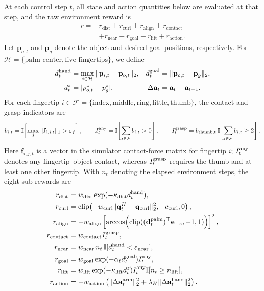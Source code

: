 \documentclass[11pt]{article}
\begin{document}
At each control step $t$, all state and action quantities below are evaluated
at that step, and the raw environment reward is
\begin{align*}
r={}&r_{\text{dist}}+r_{\text{curl}}+r_{\text{align}}+r_{\text{contact}}\\
   &+r_{\text{near}}+r_{\text{goal}}+r_{\text{lift}}+r_{\text{action}}.
\end{align*}
Let $\mathbf p_{o,t}$ and $\mathbf p_g$ denote the object and desired goal
positions, respectively.  For
$\mathcal H=\{\text{palm center},\text{five fingertips}\}$, we define
\begin{align*}
d_t^{\rm hand}
  &=\max_{i\in\mathcal H}\|\mathbf p_{i,t}-\mathbf p_{o,t}\|_2, &
d_t^{\rm goal}
  &=\|\mathbf p_{o,t}-\mathbf p_g\|_2,\\
d_t^{z}
  &=|p_{o,t}^{z}-p_g^{z}|, &
\Delta\mathbf a_t&=\mathbf a_t-\mathbf a_{t-1}.
\end{align*}
For each fingertip
$i\in\mathcal F=\{\mathrm{index,middle,ring,little,thumb}\}$, the contact
and grasp indicators are
\begin{equation*}
b_{i,t}=\mathbb I\!\left[
  \max_j\|\mathbf f_{i,j,t}\|_1>\varepsilon_f
\right],\qquad
I_t^{\rm any}=\mathbb I\!\left[\sum_{i\in\mathcal F}b_{i,t}>0\right],
\qquad
I_t^{\rm grasp}=b_{\rm thumb,t}\,
\mathbb I\!\left[\sum_{i\in\mathcal F}b_{i,t}\geq2\right].
\end{equation*}
Here $\mathbf f_{i,j,t}$ is a vector in the simulator contact-force matrix for
fingertip $i$; $I_t^{\rm any}$ denotes any fingertip--object contact, whereas
$I_t^{\rm grasp}$ requires the thumb and at least one other fingertip.  With
$n_t$ denoting the elapsed environment steps, the eight sub-rewards are
\begin{align*}
r_{\text{dist}}
  &=w_{\rm dist}\exp(-\kappa_{\rm dist}d_t^{\rm hand}),\\
r_{\text{curl}}
  &=\operatorname{clip}\!\left(
      -w_{\rm curl}\|\mathbf q_t^{H}-\mathbf q_{\rm curl}\|_2^2,
      -c_{\rm curl},0
    \right),\\
r_{\text{align}}
  &=-w_{\rm align}\left[
      \arccos\!\left(
        \operatorname{clip}((\mathbf d_t^{\rm palm})^{\top}\mathbf e_{-z},-1,1)
      \right)
    \right]^2,\\
r_{\text{contact}}
  &=w_{\rm contact} I_t^{\rm grasp},\\
r_{\text{near}}
  &=w_{\rm near}\,n_t\,\mathbb I[d_t^{\rm hand}<\varepsilon_{\rm near}],\\
r_{\text{goal}}
  &=w_{\rm goal}\exp(-\alpha_t d_t^{\rm goal})I_t^{\rm any},\\
r_{\text{lift}}
  &=w_{\rm lift}\exp(-\kappa_{\rm lift}d_t^{z})
    I_t^{\rm any}\mathbb I[n_t\geq n_{\rm lift}],\\
r_{\text{action}}
  &=-w_{\rm action}\left(
      \|\Delta\mathbf a_t^{\rm arm}\|_2^2
      +\lambda_H\|\Delta\mathbf a_t^{\rm hand}\|_2^2
    \right).
\end{align*}
\end{document}
